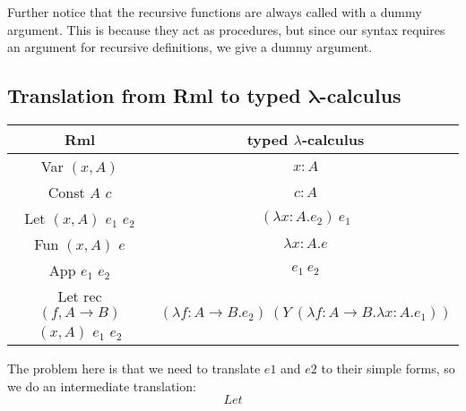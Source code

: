 \documentclass[11pt, leqno]{article}
\theoremstyle{definition}
\begin{document}
Further notice that the recursive functions are always called with a dummy
argument. This is because they act as procedures, but since our syntax requires an
argument for recursive definitions, we give a dummy argument.


\subsection{Translation from Rml to typed $\mathbf{\lambda}$-calculus}
\begin{center}
  \begin{tabular}{|c|c|}
    \hline
    Rml & typed $\lambda$-calculus \\ \hline
    Var $(x,A)$ & $x : A$ \\
    Const $A$ $c$ & $c : A$ \\
    Let $(x,A)$ $e_1$ $e_2$ & $(\lambda x : A. e_2)~e_1$ \\
    Fun $(x,A)$ $e$ & $\lambda x : A. e$ \\
    App $e_1$ $e_2$ & $e_1~e_2$ \\
    Let rec $(f,A \rightarrow B)$ $(x,A)$ $e_1$ $e_2$ & $(\lambda f : A \rightarrow B. e_2)~(Y~(\lambda f : A \rightarrow B. \lambda x : A. e_1))$ \\ \hline
  \end{tabular}
\end{center}
The problem here is that we need to translate \(e1\) and \(e2\) to their simple forms, so we do an intermediate translation:
\[Let\]
\end{document}
